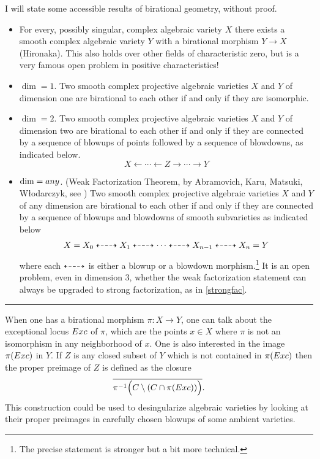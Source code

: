 \documentclass[11pt]{article}
\numberwithin{equation}{section}
\numberwithin{footnote}{section}
\newcommand{\blue}{\color{blue}}
\begin{document}
\smallskip
I will state some accessible results of birational geometry, without proof.
\begin{itemize}

\item
For every, possibly singular, complex algebraic variety $X$ there exists a smooth complex algebraic variety $Y$ with a birational morphism $Y\to X$ (Hironaka). This also holds over other fields of characteristic zero, but is a very famous open problem in positive characteristics!

\item 
 $\dim = 1$. Two smooth complex projective  algebraic varieties $X$ and $Y$ of dimension one are birational to each other if and only if they are isomorphic.
 
 \item 
 $\dim = 2$. Two smooth complex projective algebraic varieties $X$ and $Y$ of dimension two are birational to each other if and only if they are connected by a sequence of blowups of points followed by a sequence of blowdowns, as indicated below.
\begin{equation}\label{strongfac}
X\leftarrow\cdots\leftarrow Z \rightarrow \cdots\rightarrow Y
\end{equation}

\item 
 $\dim = {\rm any}$. ({\blue Weak Factorization Theorem}, by Abramovich, Karu, Matsuki, W\l odarczyk, see \cite{AKMW})
Two smooth complex projective algebraic varieties $X$ and $Y$ of any dimension are birational to each other if and only if they are connected by a sequence of blowups and blowdowns of smooth subvarieties as indicated below
\begin{align*}
X = X_0 \dashleftarrow \hskip -5pt\dashrightarrow X_1 \dashleftarrow \hskip -5pt\dashrightarrow \cdots \dashleftarrow \hskip -5pt\dashrightarrow X_{n-1}
\dashleftarrow \hskip -5pt\dashrightarrow X_n=Y
\end{align*}
where each $\dashleftarrow\hskip -5pt \dashrightarrow$ is either a blowup or a blowdown morphism.\footnote{ The precise statement is stronger but a bit more technical.} 
It is an open problem, even in dimension $3$, whether the weak factorization statement can always be upgraded to strong factorization, as in \eqref{strongfac}.
\end{itemize}

\smallskip
{\blue \hrule}

When one has a birational morphism $\pi:X\to Y$, one can talk about the {\blue exceptional locus} ${\rm Exc}$ of $\pi$, which are the points $x\in X$ where $\pi$ is not an isomorphism in any neighborhood of $x$. One is also interested in the image $\pi({\rm Exc})$ in $Y$. If $Z$ is any closed subset of $Y$ which is not contained in $\pi({\rm Exc})$ then the {\blue proper preimage} of $Z$ is defined as the closure
\begin{equation}\label{properpreimage}
\overline {\pi^{-1}\Big(C\setminus (C\cap \pi({\rm Exc}))\Big)}.
\end{equation}
This construction could be used to desingularize algebraic varieties by looking at their proper preimages in carefully chosen blowups of some ambient varieties. 
\end{document}
